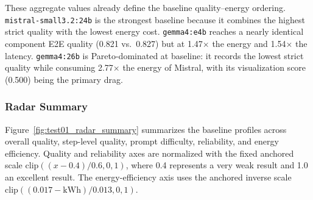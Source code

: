 \begin{table}[H]
\centering
{}
\caption{Test~01 aggregate results per model averaged over three repeats (missing pipeline outputs counted as zero).}
\label{tab:test01aggregate}
\end{table}

These aggregate values already define the baseline quality--energy ordering.
\texttt{mistral-\allowbreak small3.2:24b} is the strongest baseline because it combines
the highest strict quality with the lowest energy cost.
\texttt{gemma4:e4b} reaches a nearly identical component E2E quality
(0.821 vs.\ 0.827) but at 1.47$\times$ the energy and 1.54$\times$ the
latency. \texttt{gemma4:26b} is Pareto-dominated at baseline: it records the
lowest strict quality while consuming 2.77$\times$ the energy of Mistral, with
its visualization score (0.500) being the primary drag.

\subsubsection{Radar Summary}

Figure~\ref{fig:test01_radar_summary} summarizes the baseline profiles across
overall quality, step-level quality, prompt difficulty, reliability, and energy
efficiency. Quality and reliability axes are normalized with the fixed anchored
scale $\mathrm{clip}((x - 0.4)/0.6, 0, 1)$, where 0.4 represents a very weak
result and 1.0 an excellent result. The energy-efficiency axis uses the
anchored inverse scale $\mathrm{clip}((0.017 - \mathrm{kWh})/0.013, 0, 1)$.

